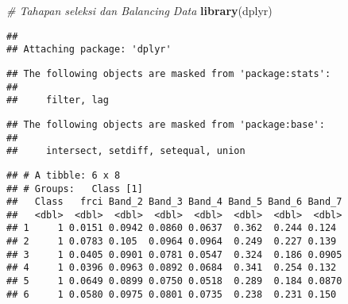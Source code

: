 \documentclass[]{article}
\newenvironment{Shaded}{\begin{snugshade}}{\end{snugshade}}
\newcommand{\KeywordTok}[1]{\textcolor[rgb]{0.13,0.29,0.53}{\textbf{#1}}}
\newcommand{\DataTypeTok}[1]{\textcolor[rgb]{0.13,0.29,0.53}{#1}}
\newcommand{\StringTok}[1]{\textcolor[rgb]{0.31,0.60,0.02}{#1}}
\newcommand{\CommentTok}[1]{\textcolor[rgb]{0.56,0.35,0.01}{\textit{#1}}}
\newcommand{\OperatorTok}[1]{\textcolor[rgb]{0.81,0.36,0.00}{\textbf{#1}}}
\newcommand{\NormalTok}[1]{#1}
\begin{document}
\begin{Shaded}
\begin{Highlighting}[]
\CommentTok{# Tahapan seleksi dan Balancing Data}
\KeywordTok{library}\NormalTok{(dplyr)}
\end{Highlighting}
\end{Shaded}

\begin{verbatim}
## 
## Attaching package: 'dplyr'
\end{verbatim}

\begin{verbatim}
## The following objects are masked from 'package:stats':
## 
##     filter, lag
\end{verbatim}

\begin{verbatim}
## The following objects are masked from 'package:base':
## 
##     intersect, setdiff, setequal, union
\end{verbatim}

\begin{Shaded}
\end{Shaded}

\begin{verbatim}
## # A tibble: 6 x 8
## # Groups:   Class [1]
##   Class   frci Band_2 Band_3 Band_4 Band_5 Band_6 Band_7
##   <dbl>  <dbl>  <dbl>  <dbl>  <dbl>  <dbl>  <dbl>  <dbl>
## 1     1 0.0151 0.0942 0.0860 0.0637  0.362  0.244 0.124 
## 2     1 0.0783 0.105  0.0964 0.0964  0.249  0.227 0.139 
## 3     1 0.0405 0.0901 0.0781 0.0547  0.324  0.186 0.0905
## 4     1 0.0396 0.0963 0.0892 0.0684  0.341  0.254 0.132 
## 5     1 0.0649 0.0899 0.0750 0.0518  0.289  0.184 0.0870
## 6     1 0.0580 0.0975 0.0801 0.0735  0.238  0.231 0.150
\end{verbatim}
\end{document}
